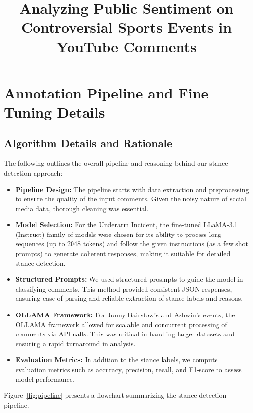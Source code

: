 \documentclass{article}
\title{Analyzing Public Sentiment on Controversial Sports Events in YouTube Comments}
\date{}
\begin{document}
\maketitle

\section{Annotation Pipeline and Fine Tuning Details}


\subsection{Algorithm Details and Rationale}
The following outlines the overall pipeline and reasoning behind our stance detection approach:
\begin{itemize}
    \item \textbf{Pipeline Design:} The pipeline starts with data extraction and preprocessing to ensure the quality of the input comments. Given the noisy nature of social media data, thorough cleaning was essential.
    \item \textbf{Model Selection:} For the Underarm Incident, the fine-tuned LLaMA-3.1 (Instruct) family of models were chosen for its ability to process long sequences (up to 2048 tokens) and follow the given instructions (as a few shot prompts) to generate coherent responses, making it suitable for detailed stance detection.
    \item \textbf{Structured Prompts:} We used structured prosmpts to guide the model in classifying comments. This method provided consistent JSON responses, ensuring ease of parsing and reliable extraction of stance labels and reasons.
    \item \textbf{OLLAMA Framework:} For Jonny Bairstow's and Ashwin's events, the OLLAMA framework allowed for scalable and concurrent processing of comments via API calls. This was critical in handling larger datasets and ensuring a rapid turnaround in analysis.
    \item \textbf{Evaluation Metrics:} In addition to the stance labels, we compute evaluation metrics such as accuracy, precision, recall, and F1-score to assess model performance.
\end{itemize}




Figure~\ref{fig:pipeline} presents a flowchart summarizing the stance detection pipeline.
\end{document}
